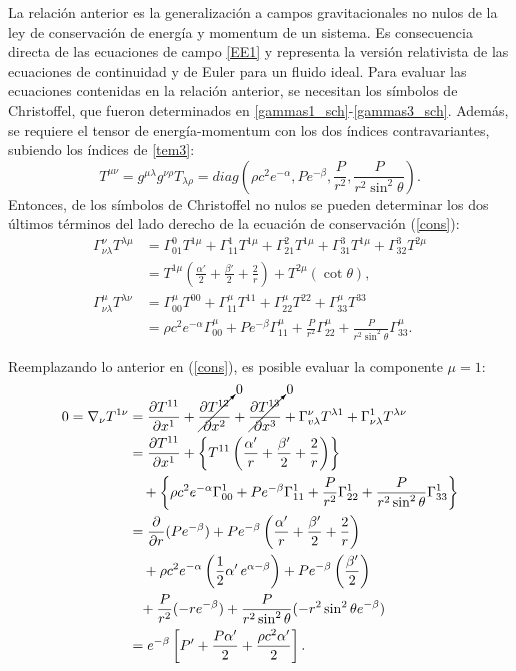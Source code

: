La relación anterior es la generalización a campos gravitacionales no nulos de la ley de conservación de energía y momentum de un sistema. Es consecuencia directa de las ecuaciones de campo \eqref{EE1} y representa la versión relativista de las ecuaciones de continuidad y de Euler para un fluido ideal. Para evaluar las ecuaciones contenidas en la relación anterior, se necesitan los símbolos de Christoffel, que fueron determinados en \eqref{gammas1_sch}-\eqref{gammas3_sch}. Además, se requiere el tensor de energía-momentum con los dos índices contravariantes, subiendo los índices de \eqref{tem3}:
\begin{equation}
 T^{\mu\nu}=g^{\mu\lambda}g^{\nu\rho}T_{\lambda\rho}=diag\left(\rho c^2 e^{-\alpha},P e^{-\beta},\frac{P}{r^2}, \frac{P}{r^2\sin^2\theta}\right).
\end{equation}
Entonces, de los símbolos de Christoffel no nulos se pueden determinar los dos últimos términos del lado derecho de la ecuación de conservación (\ref{cons}):
\begin{align}
 \Gamma^{\nu}_{\nu\lambda}T^{\lambda\mu}&=\Gamma_{01}^{0}T^{1\mu}+\Gamma_{11}^{1}T^{1\mu}+\Gamma_{21}^{2}T^{1\mu}+\Gamma_{31}^3T^{1\mu}+\Gamma_{32}^3T^{2\mu}\\&=T^{1\mu}\left(\frac{\alpha'}{2}+\frac{\beta'}{2}+\frac{2}{r}\right)+T^{2\mu}(\cot\theta),\\
\Gamma^{\mu}_{\nu\lambda}T^{\lambda\nu}&=\Gamma_{00}^{\mu}T^{00}+\Gamma_{11}^{\mu}T^{11}+\Gamma_{22}^{\mu}T^{22}+\Gamma_{33}^{\mu}T^{33}\\&=\rho c^2e^{-\alpha}\Gamma^{\mu}_{00}+Pe^{-\beta}\Gamma^{\mu}_{11}+\frac{P}{r^2}\Gamma^{\mu}_{22}+\frac{P}{r^2\sin^2\theta}\Gamma^{\mu}_{33}.
\end{align}

Reemplazando lo anterior en (\ref{cons}), es posible evaluar la componente $\mu=1$:
\begin{align}
 0=\nabla_{\nu}T^{1\nu}&=\frac{\partial T^{11}}{\partial x^1}+\cancelto{0}{\frac{\partial T^{12}}{\partial x^2}}+\cancelto{0}{\frac{\partial T^{13}}{\partial x^3}}+\Gamma_{v\lambda}^{\nu}T^{\lambda1}+\Gamma_{\nu\lambda}^{1}T^{\lambda\nu}\\
&=\frac{\partial T^{11}}{\partial x^1}+\left\{T^{11}\left(\frac{\alpha'}{r}+\frac{\beta'}{2}+\frac{2}{r}\right)\right\} \nonumber\\
&\quad+\left\{\rho c^2 e^{-\alpha}\Gamma^{1}_{00}+Pe^{-\beta}\Gamma^{1}_{11}+\frac{P}{r^2}\Gamma^{1}_{22}+\frac{P}{r^2\sin^2\theta}\Gamma^{1}_{33}\right\}\\
&=\frac{\partial}{\partial r}(Pe^{-\beta})+Pe^{-\beta}\left(\frac{\alpha'}{r}+\frac{\beta'}{2}+\frac{2}{r}\right) \nonumber\\
&\quad+\rho c^2 e^{-\alpha}\left(\frac{1}{2}\alpha'\, e^{\alpha-\beta}\right)+Pe^{-\beta}\left(\frac{\beta'}{2}\right) \nonumber\\
&\phantom{+}+\frac{P}{r^2}(-re^{-\beta})+\frac{P}{r^2\sin^2\theta}(-r^2\sin^2\theta e^{-\beta})\\
&=e^{-\beta}\left[P'+\frac{P\alpha'}{2}+\frac{\rho c^2 \alpha'}{2}\right].
\end{align}

